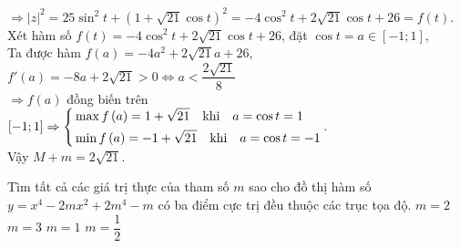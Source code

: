 \begin{ex}
{$\Rightarrow \left|z\right|^2 = 25\sin^2 t + \left(1 + \sqrt{21}\cos t\right)^2 = - 4\cos^2 t + 2\sqrt{21}\cos t + 26 = f\left(t\right)$.\\
Xét hàm số $f\left(t\right) = - 4\cos^2 t + 2\sqrt{21}\cos t + 26$, đặt $\cos t = a \in \left[-1;1\right]$, \\
Ta được hàm $f\left(a\right) = - 4a^2 + 2\sqrt{21}a + 26$, $f'\left(a\right) = - 8a + 2\sqrt{21} > 0 \Leftrightarrow a < \dfrac{2\sqrt{21}}{8}$\\
$\Rightarrow f\left(a\right)$ đồng biến trên $\left[-1;1\right] \Rightarrow \left\{\begin{aligned}&\max f\left(a\right) = 1 + \sqrt{21} \quad \text{khi} \quad a = \cos t = 1\\&\min f\left(a\right) = - 1 + \sqrt{21} \quad \text{khi} \quad a = \cos t = -1\end{aligned}\right.$.\\
Vậy $M + m = 2\sqrt{21}$.
}
\end{ex}
\begin{ex}%
Tìm tất cả các giá trị thực của tham số $m$ sao cho đồ thị hàm số $y = x^4 - 2mx^2 + 2m^4 - m$ có ba điểm cực trị đều thuộc các trục tọa độ.
\choice
{$m = 2$}
{$m = 3$}
{\True $m = 1$}
{$m = \dfrac{1}{2}$}
\end{ex}
